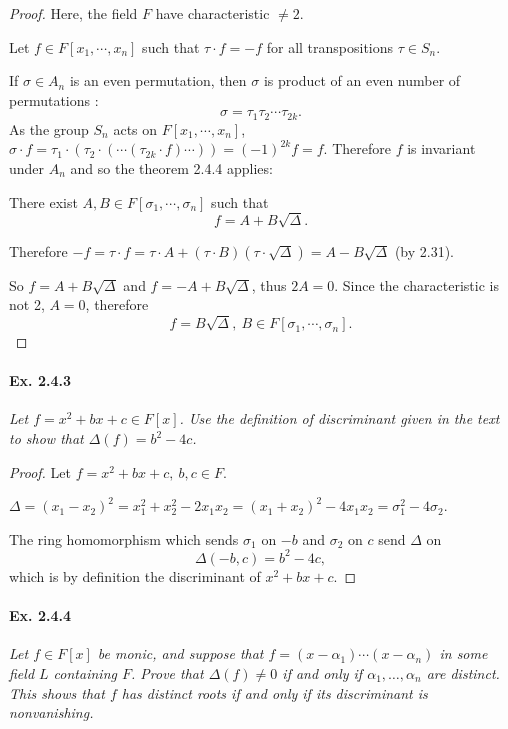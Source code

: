\documentclass[11pt,a4paper]{article}
\begin{document}
\begin{proof}
 Here, the field $F$ have characteristic $\ne 2$.
 
Let $f\in F[x_1,\cdots,x_n]$  such that $\tau \cdot f = -f$ for all transpositions $\tau \in S_n$.
 
If $\sigma \in A_n$ is an even permutation, then $\sigma$ is product of an even number of permutations :
 $$\sigma = \tau_1 \tau_2\cdots \tau_{2k}.$$
As the group $S_n$ acts on $F[x_1,\cdots,x_n]$,  $\sigma \cdot f = \tau_1 \cdot ( \tau_2 \cdot ( \cdots (\tau_{2k} \cdot f)\cdots)) = (-1)^{2k} f = f$. Therefore $f$ is invariant under $A_n$ and so the theorem  2.4.4 applies:

There exist $A,B \in F[\sigma_1,\cdots,\sigma_n]$ such that
$$f = A+B\sqrt{\Delta}.$$

Therefore $-f = \tau \cdot f = \tau \cdot A + (\tau\cdot B)(\tau \cdot \sqrt{\Delta}) = A - B\sqrt{\Delta}$ (by 2.31).

So $f = A + B\sqrt{\Delta}$ and  $f = -A+B\sqrt{\Delta}$, thus $2A=0$. Since the characteristic is not 2, $A=0$, therefore
$$f = B\sqrt{\Delta},\ B \in F[\sigma_1,\cdots,\sigma_n].$$
\end{proof}

\paragraph{Ex. 2.4.3}

{\it Let $f = x^2+bx+c \in F[x]$. Use the definition of discriminant given in the text to show that $\Delta(f) = b^2 - 4c$.
}

\begin{proof}
Let $f=x^2+bx+c, \ b,c \in F$.

$\Delta = (x_1-x_2)^2 = x_1^2+x_2^2-2x_1x_2 = (x_1+x_2)^2 -4 x_1x_2 = \sigma_1^2-4\sigma_2$.

The ring homomorphism which sends $\sigma_1$ on $-b$ and $\sigma_2$ on $c$ send $\Delta$ on
$$\Delta(-b,c) = b^2 -4c,$$
which is by definition the discriminant of $x^2+bx+c$.
\end{proof}

\paragraph{Ex. 2.4.4}

{\it Let $f \in F[x]$ be monic, and suppose that $f = (x-\alpha_1)\cdots(x-\alpha_n)$ in some field $L$ containing $F$. Prove that $\Delta(f) \ne 0$ if and only if $\alpha_1,\ldots,\alpha_n$ are distinct. This shows that $f$ has distinct roots if and only if its discriminant is nonvanishing.
}
\end{document}
